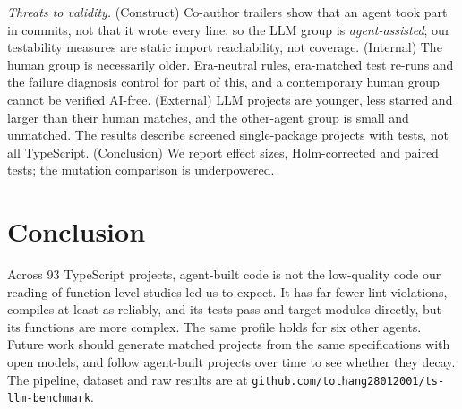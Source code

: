 \documentclass[10pt,conference]{IEEEtran}
\begin{document}
\emph{Threats to validity.} (Construct) Co-author trailers show that an agent took part in commits, not that it wrote every line, so the LLM group is \emph{agent-assisted}; our testability measures are static import reachability, not coverage. (Internal) The human group is necessarily older. Era-neutral rules, era-matched test re-runs and the failure diagnosis control for part of this, and a contemporary human group cannot be verified AI-free. (External) LLM projects are younger, less starred and larger than their human matches, and the other-agent group is small and unmatched. The results describe screened single-package projects with tests, not all TypeScript. (Conclusion) We report effect sizes, Holm-corrected and paired tests; the mutation comparison is underpowered.

\section{Conclusion}
Across 93 TypeScript projects, agent-built code is not the low-quality code our reading of function-level studies led us to expect. It has far fewer lint violations, compiles at least as reliably, and its tests pass and target modules directly, but its functions are more complex. The same profile holds for six other agents. Future work should generate matched projects from the same specifications with open models, and follow agent-built projects over time to see whether they decay. The pipeline, dataset and raw results are at \texttt{github.com/tothang28012001/ts-llm-benchmark}.
\end{document}

